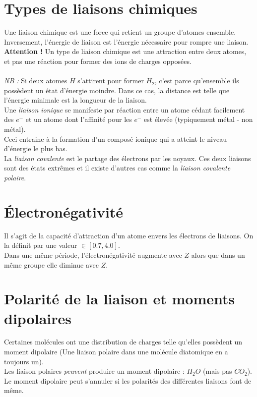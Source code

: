 \documentclass[british,french,11pt, a4paper, openany]{book}
\begin{document}
\section{Types de liaisons chimiques}
Une liaison chimique est une force qui retient un groupe d'atomes ensemble. Inversement, l'énergie de liaison est l'énergie nécessaire pour rompre une liaison.\\
\textbf{Attention !} Un type de liaison chimique est une attraction entre deux atomes, et pas une réaction pour former des ions de charges opposées.\\\\
\textit{NB :} Si deux atomes $H$ s'attirent pour former $H_2$, c'est parce qu'ensemble ils possèdent un état d'énergie moindre. Dans ce cas, la distance est telle que l'énergie minimale est la longueur de la liaison.\\

Une \textit{liaison ionique} se manifeste par réaction entre un atome cédant facilement des $e^-$ et un atome dont l'affinité pour les $e^-$ est élevée (typiquement métal - non métal).\\
Ceci entraine à la formation d'un composé ionique qui a atteint le niveau d'énergie le plus bas.\\
La \textit{liaison covalente} est le partage des électrons par les noyaux. Ces deux liaisons sont des états extrêmes et il existe d'autres cas comme la \textit{liaison covalente polaire}.

\section{Électronégativité}
Il s'agit de la capacité d'attraction d'un atome envers les électrons de liaisons. On la définit par une valeur $\in [0.7, 4.0]$.\\
Dans une même période, l'électronégativité augmente avec $Z$ alors que dans un même groupe elle diminue avec $Z$.

\section{Polarité de la liaison et moments dipolaires}
Certaines molécules ont une distribution de charges telle qu'elles possèdent un moment dipolaire (Une liaison polaire dans une molécule diatomique en a toujours un).\\
Les liaison polaires \textit{peuvent} produire un moment dipolaire : $H_2O$ (mais pas $CO_2$).\\
Le moment dipolaire peut s'annuler si les polarités des différentes liaisons font de même.
\end{document}
